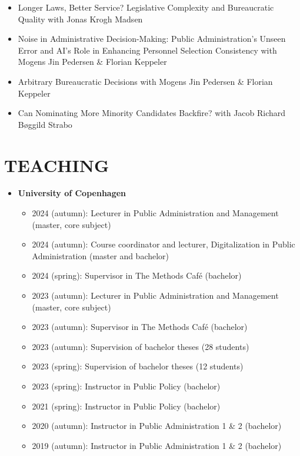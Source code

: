 \documentclass[line,margin]{res}
\begin{document}
\begin{resume}
\begin{itemize}
\begin{itemize}
\item Longer Laws, Better Service? Legislative Complexity and Bureaucratic Quality with Jonas Krogh Madsen

\item Noise in Administrative Decision-Making: Public Administration’s Unseen Error and AI’s Role in Enhancing Personnel Selection Consistency with Mogens Jin Pedersen \& Florian Keppeler

\item Arbitrary Bureaucratic Decisions with Mogens Jin Pedersen \& Florian Keppeler

\item Can Nominating More Minority Candidates Backfire? with Jacob Richard Bøggild Strabo
\end{itemize}
\end{itemize}

\section{TEACHING}
\begin{itemize}
\item \textbf{University of Copenhagen}
\begin{itemize}
    \item 2024 (autumn): Lecturer in Public Administration and Management (master, core subject)
    \item 2024 (autumn): Course coordinator and lecturer, Digitalization in Public Administration (master and bachelor)
    \item 2024 (spring): Supervisor in The Methods Café (bachelor)
    \item 2023 (autumn): Lecturer in Public Administration and Management (master, core subject)
    \item 2023 (autumn): Supervisor in The Methods Café (bachelor)
    \item 2023 (autumn): Supervision of bachelor theses (28 students)
    \item 2023 (spring): Supervision of bachelor theses (12 students)
    \item 2023 (spring): Instructor in Public Policy (bachelor)
    \item 2021 (spring): Instructor in Public Policy (bachelor)
    \item 2020 (autumn): Instructor in Public Administration 1 \& 2 (bachelor)
    \item 2019 (autumn): Instructor in Public Administration 1 \& 2 (bachelor)
\end{itemize}


\end{itemize}
\end{resume}
\end{document}
